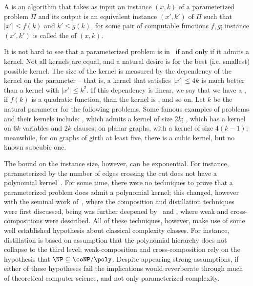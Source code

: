 \begin{class_definition*}[Kernelization]
    A   is an algorithm that takes as input an instance $(x,k)$ of a parameterized problem $\Pi$ and its output is an equivalent instance $(x',k')$ of $\Pi$ such that $|x'| \leq f(k)$ and $k' \leq g(k)$, for some pair of computable functions $f,g$; instance $(x',k')$ is called the  of $(x,k)$.
\end{class_definition*}

It is not hard to see that a parameterized problem is in \FPT\ if and only if it admits a kernel.
Not all kernels are equal, and a natural desire is for the best (i.e. smallest) possible kernel.
The size of the kernel is measured by the dependency of the kernel on the parameter -- that is, a kernel that satisfies $|x'| \leq 4k$ is much better than a kernel with $|x'| \leq k^2$.
If this dependency is linear, we say that we have a , if $f(k)$ is a quadratic function, than the kernel is , and so on.
Let $k$ be the natural parameter for the following problems.
Some famous examples of problems and their kernels include: , which admits a kernel of size $2k$; , which has a kernel on $6k$ variables and $2k$ clauses;  on planar graphs, with a kernel of size $4(k - 1)$;
meanwhile, for  on graphs of girth at least five, there is a cubic kernel, but no known subcubic one.

The bound on the instance size, however, can be exponential.
For instance,  parameterized by the number of edges crossing the cut does not have a polynomial kernel~\citep{matching_cut_ipec}.
For some time, there were no techniques to prove that a parameterized problem does  admit a polynomial kernel; this changed, however with the seminal work of~\cite{BodlaenderDFH09}, where the composition and distillation techniques were first discussed, being was further deepened
by~\cite{weak_composition} and \cite{BodlaenderJK14}, where weak and cross-compositions were described.
All of these techniques, however, make use of some well established hypothesis about classical complexity classes.
For instance, distillation is based on assumption that the polynomial hierarchy does not collapse to the third level; weak-composition and cross-composition rely on the hypothesis that $\NP \subseteq \coNP/\poly$.
Despite appearing strong assumptions, if either of these hypotheses fail the implications would reverberate through much of theoretical computer science, and not only parameterized complexity.

